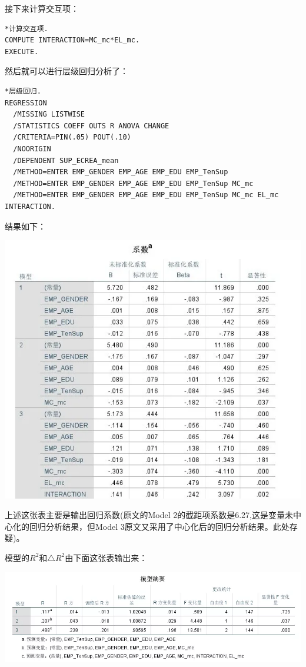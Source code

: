 \documentclass[
]{book}
\begin{document}
接下来计算交互项：

\begin{verbatim}
*计算交互项.
COMPUTE INTERACTION=MC_mc*EL_mc.
EXECUTE.
\end{verbatim}

然后就可以进行层级回归分析了：

\begin{verbatim}
*层级回归.
REGRESSION
  /MISSING LISTWISE
  /STATISTICS COEFF OUTS R ANOVA CHANGE
  /CRITERIA=PIN(.05) POUT(.10)
  /NOORIGIN 
  /DEPENDENT SUP_ECREA_mean
  /METHOD=ENTER EMP_GENDER EMP_AGE EMP_EDU EMP_TenSup
  /METHOD=ENTER EMP_GENDER EMP_AGE EMP_EDU EMP_TenSup MC_mc
  /METHOD=ENTER EMP_GENDER EMP_AGE EMP_EDU EMP_TenSup MC_mc EL_mc INTERACTION.
\end{verbatim}

结果如下：

\includegraphics{figs/1318.png}

上述这张表主要是输出回归系数(原文的Model 2的截距项系数是6.27,这是变量未中心化的回归分析结果，但Model 3原文又采用了中心化后的回归分析结果。此处存疑)。

模型的\(R^{2}\)和\(\triangle R^{2}\)由下面这张表输出来：

\includegraphics{figs/1319.png}
\end{document}
